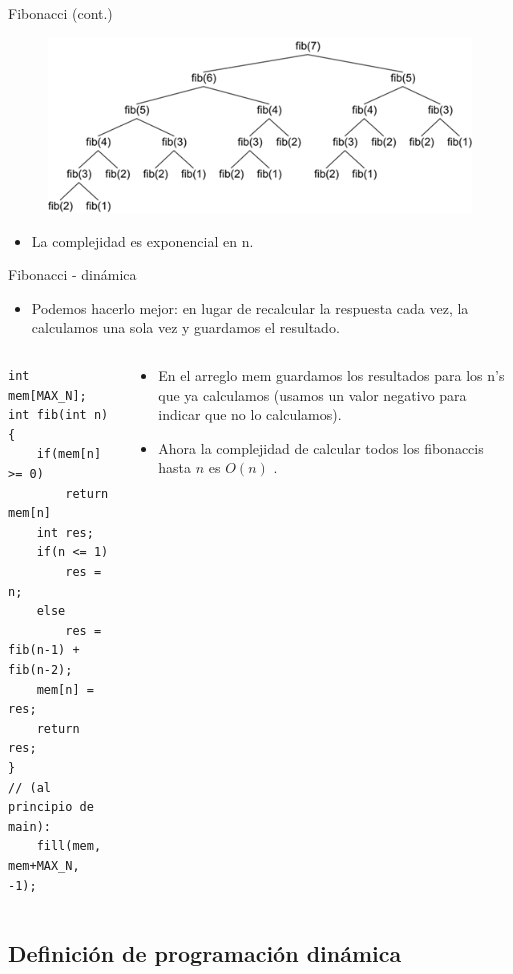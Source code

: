 \documentclass{beamer}
\begin{document}
\begin{frame}{Fibonacci (cont.)}
\begin{figure}
\includegraphics[width=\textwidth]{fibo}
\end{figure}
\begin{itemize}
\item
La complejidad es exponencial en n.
\end{itemize}
\end{frame}
\begin{frame}[fragile]{Fibonacci - din\'amica}
\begin{itemize}
\item
Podemos hacerlo mejor: en lugar de recalcular la respuesta cada vez, la calculamos una sola vez y guardamos el resultado.
\end{itemize}
\begin{columns}
\begin{column}{0.5\textwidth}
\begin{lstlisting}
int mem[MAX_N];
int fib(int n){
	if(mem[n] >= 0)
		return mem[n]
	int res;
	if(n <= 1)
		res = n;
	else
		res = fib(n-1) + fib(n-2);
	mem[n] = res;
	return res;
}
// (al principio de main):
	fill(mem, mem+MAX_N, -1);
\end{lstlisting}
\end{column}
\begin{column}{0.5\textwidth}
\begin{itemize}
\item
En el arreglo mem guardamos los resultados para los n's que ya calculamos (usamos un valor negativo para indicar que no lo calculamos).
\item
Ahora la complejidad de calcular todos los fibonaccis hasta $n$ es $O(n)$ .
\end{itemize}
\end{column}
\end{columns}
\end{frame}

\subsection{Definici\'on de programaci\'on din\'amica}
\end{document}
